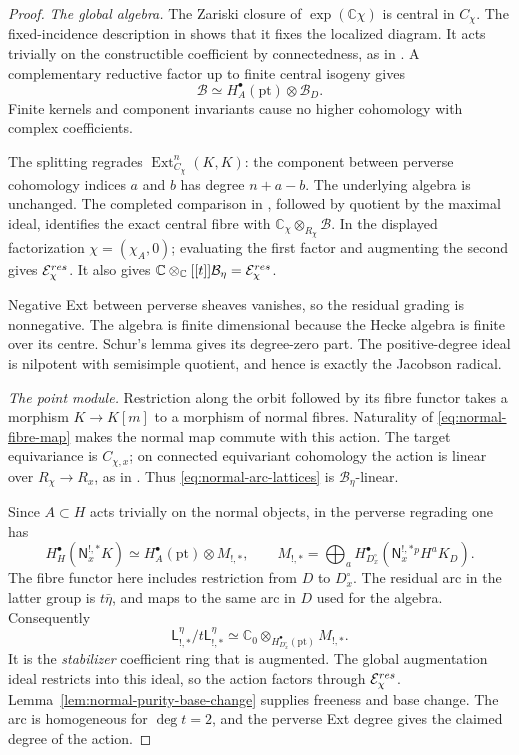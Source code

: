 \documentclass[10pt,a4paper]{amsart}
\newcommand{\C}{\mathbb C}
\newcommand{\A}{\C[[t]]}
\newcommand{\Ext}{\operatorname{Ext}}
\begin{document}
\begin{proof}
\emph{The global algebra.}
The Zariski closure of $\exp(\mathbb C\chi)$ is central in $C_\chi$.
The fixed-incidence description in \cite[Section~2.1]{Solleveld} shows
that it fixes the localized diagram.  It acts trivially on the
constructible coefficient by connectedness, as in
\cite[Lemma~2.7, equations~(2.23)--(2.24)]{Solleveld}.
A complementary reductive factor up to finite central isogeny gives
\[
 \mathcal B\simeq H_A^\bullet(\mathrm{pt})\otimes\mathcal B_D.
\]
Finite kernels and component invariants cause no higher cohomology
with complex coefficients.

The splitting regrades $\Ext^n_{C_\chi}(K,K)$: the component between
perverse cohomology indices $a$ and $b$ has degree $n+a-b$.
The underlying algebra is unchanged.
The completed comparison in
\cite[Proposition~2.3 and Theorem~2.5]{Solleveld}, followed by quotient
by the maximal ideal, identifies the exact central fibre with
$\mathbb C_\chi\otimes_{R_\chi}\mathcal B$.  In the displayed
factorization $\chi=(\chi_A,0)$; evaluating the first factor and
augmenting the second gives $\mathcal E_\chi^{\rm res}$.  It also gives
$\mathbb C\otimes_\A\mathcal B_\eta=\mathcal E_\chi^{\rm res}$.

Negative Ext between perverse sheaves vanishes, so the residual grading
is nonnegative.  The algebra is finite dimensional because the Hecke
algebra is finite over its centre.  Schur's lemma gives its degree-zero
part.  The positive-degree ideal is nilpotent with semisimple quotient,
and hence is exactly the Jacobson radical.

\smallskip
\emph{The point module.}
Restriction along the orbit followed by its fibre functor takes a
morphism $K\to K[m]$ to a morphism of normal fibres.  Naturality of
\eqref{eq:normal-fibre-map} makes the normal map commute with this
action.  The target equivariance is $C_{\chi,x}$; on connected
equivariant cohomology the action is linear over $R_\chi\to R_x$, as in
\cite[equations~(3.15)--(3.16)]{Solleveld}.  Thus
\eqref{eq:normal-arc-lattices} is $\mathcal B_\eta$-linear.

Since $A\subset H$ acts trivially on the normal objects, in the
perverse regrading one has
\[
 H_H^\bullet(\mathsf N_x^{!,*}K)
 \simeq H_A^\bullet(\mathrm{pt})\otimes M_{!,*},\qquad
 M_{!,*}=\bigoplus_a
 H_{D_x^\circ}^\bullet(\mathsf N_x^{!,*}{}^pH^aK_D).
\]
The fibre functor here includes restriction from $D$ to $D_x^\circ$.
The residual arc in the latter group is $t\bar\eta$, and maps to the
same arc in $D$ used for the algebra.  Consequently
\[
 \mathsf L_{!,*}^\eta/t\mathsf L_{!,*}^\eta
 \simeq\mathbb C_0\otimes_{H_{D_x^\circ}^\bullet(\mathrm{pt})}M_{!,*}.
\]
It is the \emph{stabilizer} coefficient ring that is augmented.
The global augmentation ideal restricts into this ideal, so the
action factors through $\mathcal E_\chi^{\rm res}$.
Lemma~\ref{lem:normal-purity-base-change} supplies freeness and base
change.  The arc is homogeneous for $\deg t=2$, and the perverse Ext
degree gives the claimed degree of the action.


\end{proof}
\end{document}

